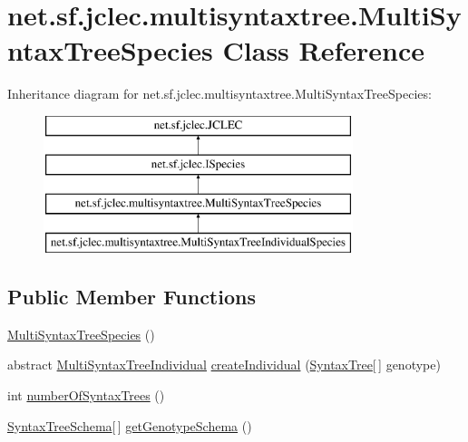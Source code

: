 \hypertarget{classnet_1_1sf_1_1jclec_1_1multisyntaxtree_1_1_multi_syntax_tree_species}{\section{net.\-sf.\-jclec.\-multisyntaxtree.\-Multi\-Syntax\-Tree\-Species Class Reference}
\label{classnet_1_1sf_1_1jclec_1_1multisyntaxtree_1_1_multi_syntax_tree_species}
}
Inheritance diagram for net.\-sf.\-jclec.\-multisyntaxtree.\-Multi\-Syntax\-Tree\-Species\-:\begin{figure}[H]
\begin{center}
\leavevmode
\includegraphics[height=4.000000cm]{classnet_1_1sf_1_1jclec_1_1multisyntaxtree_1_1_multi_syntax_tree_species}
\end{center}
\end{figure}
\subsection*{Public Member Functions}
\begin{DoxyCompactItemize}
\item 
\hyperlink{classnet_1_1sf_1_1jclec_1_1multisyntaxtree_1_1_multi_syntax_tree_species_a741be81cd46b8210831ae22d201bac30}{Multi\-Syntax\-Tree\-Species} ()
\item 
abstract \hyperlink{classnet_1_1sf_1_1jclec_1_1multisyntaxtree_1_1_multi_syntax_tree_individual}{Multi\-Syntax\-Tree\-Individual} \hyperlink{classnet_1_1sf_1_1jclec_1_1multisyntaxtree_1_1_multi_syntax_tree_species_a032e6812efbbe77d1e37a881ef2f50aa}{create\-Individual} (\hyperlink{classnet_1_1sf_1_1jclec_1_1syntaxtree_1_1_syntax_tree}{Syntax\-Tree}\mbox{[}$\,$\mbox{]} genotype)
\item 
int \hyperlink{classnet_1_1sf_1_1jclec_1_1multisyntaxtree_1_1_multi_syntax_tree_species_ac0191a71ecc2e1fb8372dbce8fd82c15}{number\-Of\-Syntax\-Trees} ()
\item 
\hyperlink{classnet_1_1sf_1_1jclec_1_1syntaxtree_1_1_syntax_tree_schema}{Syntax\-Tree\-Schema}\mbox{[}$\,$\mbox{]} \hyperlink{classnet_1_1sf_1_1jclec_1_1multisyntaxtree_1_1_multi_syntax_tree_species_af42037ac0433dd053b8564d2fd9561fc}{get\-Genotype\-Schema} ()
\end{DoxyCompactItemize}
